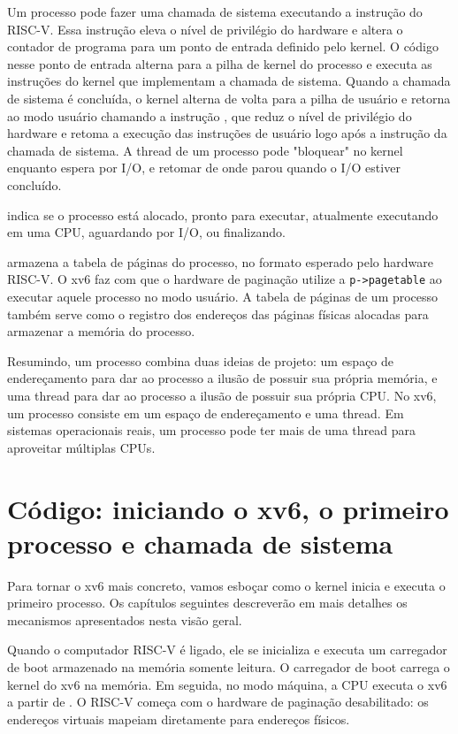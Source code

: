 Um processo pode fazer uma chamada de sistema executando a instrução 
do RISC-V. Essa instrução eleva o nível de privilégio do hardware e
altera o contador de programa para um ponto de entrada definido pelo kernel. O código
nesse ponto de entrada alterna para a pilha de kernel do processo e executa as instruções do kernel
que implementam a chamada de sistema. Quando a chamada de sistema
é concluída, o kernel alterna de volta para a pilha de usuário e retorna ao
modo usuário chamando a instrução , que reduz
o nível de privilégio do hardware e retoma a execução das instruções de usuário
logo após a instrução da chamada de sistema. A thread de um processo pode
"bloquear" no kernel enquanto espera por I/O, e retomar de onde parou
quando o I/O estiver concluído.

indica se o processo está alocado, pronto
para executar, atualmente executando em uma CPU, aguardando por I/O, ou finalizando.

armazena a tabela de páginas do processo, no formato
esperado pelo hardware RISC-V.
O xv6 faz com que o hardware de paginação utilize a
\lstinline{p->pagetable}
ao executar aquele processo no modo usuário.
A tabela de páginas de um processo também serve como o registro dos
endereços das páginas físicas alocadas para armazenar a memória do processo.

Resumindo, um processo combina duas ideias de projeto: um espaço de endereçamento para
dar ao processo a ilusão de possuir sua própria memória, e uma thread para dar
ao processo a ilusão de possuir sua própria CPU. No xv6, um processo consiste
em um espaço de endereçamento e uma thread. Em sistemas operacionais reais,
um processo pode ter mais de uma thread para aproveitar múltiplas CPUs.

\section{Código: iniciando o xv6, o primeiro processo e chamada de sistema}

Para tornar o xv6 mais concreto, vamos esboçar como o kernel inicia e executa o primeiro processo. Os capítulos seguintes descreverão em mais detalhes os mecanismos apresentados nesta visão geral.

Quando o computador RISC-V é ligado, ele se inicializa e executa um carregador de boot armazenado na memória somente leitura. O carregador de boot carrega o kernel do xv6 na memória. Em seguida, no modo máquina, a CPU executa o xv6 a partir de
.
O RISC-V começa com o hardware de paginação desabilitado: os endereços virtuais mapeiam diretamente para endereços físicos.

